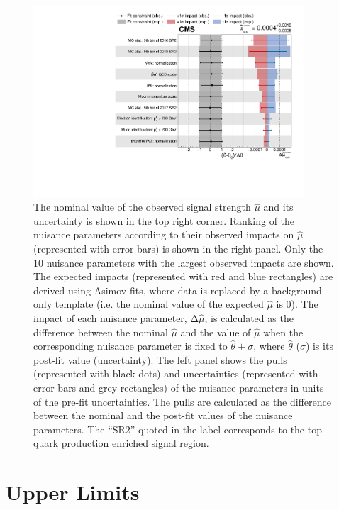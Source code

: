 \begin{figure}[tbh!] 
\begin{center}
\includegraphics[width=0.9\textwidth]{figures/Part3/Results/Impact_VecU}
 \caption{The nominal value of the observed signal strength $\hat{\mu}$ and its uncertainty is shown in the top right corner. Ranking of the nuisance parameters according to their observed impacts on $\hat{\mu}$ (represented with error bars) is shown in the right panel. Only the 10 nuisance parameters with the largest observed impacts are shown. The expected impacts (represented with red and blue rectangles) are derived using Asimov fits, where data is replaced by a background-only template (i.e. the nominal value of the expected $\hat{\mu}$ is 0). The impact of each nuisance parameter, $\mathrm{\Delta}\hat{\mu}$, is calculated as the difference between the nominal $\hat{\mu}$ and the value of $\hat{\mu}$ when the corresponding nuisance parameter is fixed to $\hat{\theta}\pm\sigma$, where $\hat{\theta}$ ($\sigma$) is its post-fit value (uncertainty). The left panel shows the pulls (represented with black dots) and uncertainties (represented with error bars and grey rectangles) of the nuisance parameters in units of the pre-fit uncertainties. The pulls are calculated as the difference between the nominal and the post-fit values of the nuisance parameters. The ``\ac{SR}2'' quoted in the label corresponds to the top quark production enriched signal region.}
 \label{fig:Impact}
 \end{center}
\end{figure}

\section{Upper Limits}
\label{sec:Limits}

